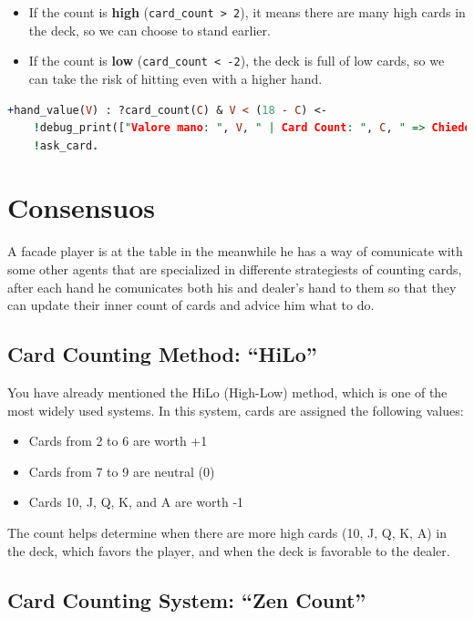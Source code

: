 \begin{itemize}
    \item If the count is \textbf{high} (\texttt{card\_count > 2}), it means there are many high cards in the deck, so we can choose to stand earlier.
    \item If the count is \textbf{low} (\texttt{card\_count < -2}), the deck is full of low cards, so we can take the risk of hitting even with a higher hand.
\end{itemize}

\begin{lstlisting}[language=Prolog]
    +hand_value(V) : ?card_count(C) & V < (18 - C) <-
    !debug_print(["Valore mano: ", V, " | Card Count: ", C, " => Chiedo carta!"]);
    !ask_card.
\end{lstlisting}

\section{Consensuos}

A facade player is at the table in the meanwhile he has a way of comunicate with some other agents that are specialized in differente strategiests of counting cards, after each hand he comunicates both his and dealer's hand to them so that they can update their inner count of cards and advice him what to do.

\subsection{Card Counting Method: ``HiLo''}

You have already mentioned the HiLo (High-Low) method, which is one of the most widely used systems. In this system, cards are assigned the following values:

\begin{itemize}
    \item Cards from 2 to 6 are worth +1
    \item Cards from 7 to 9 are neutral (0)
    \item Cards 10, J, Q, K, and A are worth -1
\end{itemize}

The count helps determine when there are more high cards (10, J, Q, K, A) in the deck, which favors the player, and when the deck is favorable to the dealer.

\subsection{Card Counting System: ``Zen Count''}

